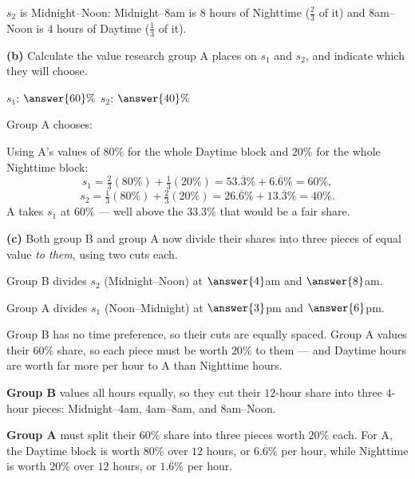 \documentclass[12pt]{ximera}
\begin{document}
\begin{problem}
\begin{prompt}
\begin{feedback}
$s_2$ is Midnight--Noon: Midnight--8am is $8$ hours of Nighttime ($\frac23$ of it) and
8am--Noon is $4$ hours of Daytime ($\frac13$ of it).
\end{feedback}
\end{prompt}

\begin{prompt}
\textbf{(b)} Calculate the value research group A places on $s_1$ and $s_2$, and
indicate which they will choose.

$s_1$: $\answer{60}\%$ \qquad $s_2$: $\answer{40}\%$

\smallskip
Group A chooses:
\begin{multipleChoice}
\end{multipleChoice}

\begin{feedback}
Using A's values of $80\%$ for the whole Daytime block and $20\%$ for the whole
Nighttime block:
\[
s_1 = \tfrac23(80\%) + \tfrac13(20\%) = 53.\overline{3}\% + 6.\overline{6}\% = 60\%,
\]
\[
s_2 = \tfrac13(80\%) + \tfrac23(20\%) = 26.\overline{6}\% + 13.\overline{3}\% = 40\%.
\]
A takes $s_1$ at $60\%$ --- well above the $33.3\%$ that would be a fair share.
\end{feedback}
\end{prompt}

\begin{prompt}
\textbf{(c)} Both group B and group A now divide their shares into three pieces of
equal value \emph{to them}, using two cuts each.

Group B divides $s_2$ (Midnight--Noon) at $\answer{4}$am and $\answer{8}$am.

\smallskip
Group A divides $s_1$ (Noon--Midnight) at $\answer{3}$pm and $\answer{6}$pm.

\begin{hint}
Group B has no time preference, so their cuts are equally spaced. Group A values their
$60\%$ share, so each piece must be worth $20\%$ to them --- and Daytime hours are worth
far more per hour to A than Nighttime hours.
\end{hint}

\begin{feedback}
\textbf{Group B} values all hours equally, so they cut their $12$-hour share into
three $4$-hour pieces: Midnight--4am, 4am--8am, and 8am--Noon.

\textbf{Group A} must split their $60\%$ share into three pieces worth $20\%$ each.
For A, the Daytime block is worth $80\%$ over $12$ hours, or
$6.\overline{6}\%$ per hour, while Nighttime is worth $20\%$ over $12$ hours, or
$1.\overline{6}\%$ per hour.


\end{feedback}
\end{prompt}
\end{problem}
\end{document}
